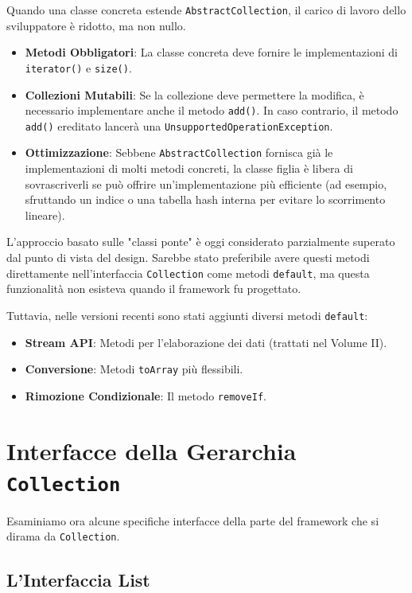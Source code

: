 Quando una classe concreta estende \texttt{AbstractCollection}, il carico di lavoro dello sviluppatore è ridotto, ma non nullo. 

\begin{itemize}
    \item \textbf{Metodi Obbligatori}: La classe concreta deve fornire le implementazioni di \texttt{iterator()} e \texttt{size()}.
    \item \textbf{Collezioni Mutabili}: Se la collezione deve permettere la modifica, è necessario implementare anche il metodo \texttt{add()}. In caso contrario, il metodo \texttt{add()} ereditato lancerà una \texttt{UnsupportedOperationException}.
    \item \textbf{Ottimizzazione}: Sebbene \texttt{AbstractCollection} fornisca già le implementazioni di molti metodi concreti, la classe figlia è libera di sovrascriverli se può offrire un'implementazione più efficiente (ad esempio, sfruttando un indice o una tabella hash interna per evitare lo scorrimento lineare).
\end{itemize}

\begin{dettagli}
    L'approccio basato sulle "classi ponte" è oggi considerato parzialmente superato dal punto di vista del design. Sarebbe stato preferibile avere questi metodi direttamente nell'interfaccia \texttt{Collection} come metodi \texttt{default}, ma questa funzionalità non esisteva quando il framework fu progettato.

    Tuttavia, nelle versioni recenti sono stati aggiunti diversi metodi \texttt{default}:
    \begin{itemize}
    \item \textbf{Stream API}: Metodi per l'elaborazione dei dati (trattati nel Volume II).
    \item \textbf{Conversione}: Metodi \texttt{toArray} più flessibili.
    \item \textbf{Rimozione Condizionale}: Il metodo \texttt{removeIf}.
\end{itemize}
\end{dettagli}

\section{Interfacce della Gerarchia \texttt{Collection}}
Esaminiamo ora alcune specifiche interfacce della parte del framework che si dirama da \texttt{Collection}.
\subsection{L'Interfaccia List}

